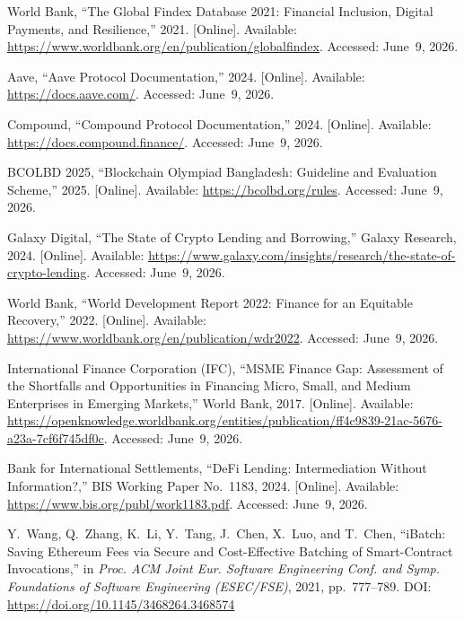 \documentclass[12pt, a4paper]{report}
\begin{document}
{\begin{enumerate}[label={[\arabic*]}]
\item World Bank, ``The Global Findex Database 2021: Financial Inclusion, Digital Payments, and Resilience,'' 2021. [Online]. Available: \url{https://www.worldbank.org/en/publication/globalfindex}. Accessed: June~9, 2026.

\item Aave, ``Aave Protocol Documentation,'' 2024. [Online]. Available: \url{https://docs.aave.com/}. Accessed: June~9, 2026.

\item Compound, ``Compound Protocol Documentation,'' 2024. [Online]. Available: \url{https://docs.compound.finance/}. Accessed: June~9, 2026.

\item BCOLBD 2025, ``Blockchain Olympiad Bangladesh: Guideline and Evaluation Scheme,'' 2025. [Online]. Available: \url{https://bcolbd.org/rules}. Accessed: June~9, 2026.

\item Galaxy Digital, ``The State of Crypto Lending and Borrowing,'' Galaxy Research, 2024. [Online]. Available: \url{https://www.galaxy.com/insights/research/the-state-of-crypto-lending}. Accessed: June~9, 2026.

\item World Bank, ``World Development Report 2022: Finance for an Equitable Recovery,'' 2022. [Online]. Available: \url{https://www.worldbank.org/en/publication/wdr2022}. Accessed: June~9, 2026.

\item International Finance Corporation (IFC), ``MSME Finance Gap: Assessment of the Shortfalls and Opportunities in Financing Micro, Small, and Medium Enterprises in Emerging Markets,'' World Bank, 2017. [Online]. Available: \url{https://openknowledge.worldbank.org/entities/publication/ff4c9839-21ac-5676-a23a-7cf6f745df0c}. Accessed: June~9, 2026.

\item Bank for International Settlements, ``DeFi Lending: Intermediation Without Information?,'' BIS Working Paper No.~1183, 2024. [Online]. Available: \url{https://www.bis.org/publ/work1183.pdf}. Accessed: June~9, 2026.

\item Y.~Wang, Q.~Zhang, K.~Li, Y.~Tang, J.~Chen, X.~Luo, and T.~Chen, ``iBatch: Saving Ethereum Fees via Secure and Cost-Effective Batching of Smart-Contract Invocations,'' in \textit{Proc. ACM Joint Eur. Software Engineering Conf. and Symp. Foundations of Software Engineering (ESEC/FSE)}, 2021, pp.~777--789. DOI: \url{https://doi.org/10.1145/3468264.3468574}


\end{enumerate}}
\end{document}
